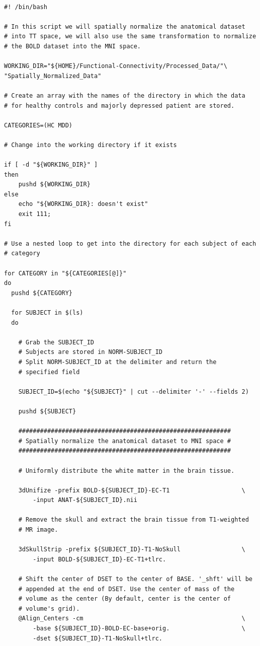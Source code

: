 \documentclass[12pt]{article}
\begin{document}
\begin{verbatim}

#! /bin/bash

# In this script we will spatially normalize the anatomical dataset
# into TT space, we will also use the same transformation to normalize
# the BOLD dataset into the MNI space.

WORKING_DIR="${HOME}/Functional-Connectivity/Processed_Data/"\
"Spatially_Normalized_Data"

# Create an array with the names of the directory in which the data
# for healthy controls and majorly depressed patient are stored.

CATEGORIES=(HC MDD)

# Change into the working directory if it exists

if [ -d "${WORKING_DIR}" ]
then
    pushd ${WORKING_DIR}
else
    echo "${WORKING_DIR}: doesn't exist"
    exit 111;
fi

# Use a nested loop to get into the directory for each subject of each
# category

for CATEGORY in "${CATEGORIES[@]}"
do
  pushd ${CATEGORY}

  for SUBJECT in $(ls)
  do

    # Grab the SUBJECT_ID
    # Subjects are stored in NORM-SUBJECT_ID
    # Split NORM-SUBJECT_ID at the delimiter and return the
    # specified field

    SUBJECT_ID=$(echo "${SUBJECT}" | cut --delimiter '-' --fields 2)

    pushd ${SUBJECT}

    ###########################################################
    # Spatially normalize the anatomical dataset to MNI space #
    ###########################################################

    # Uniformly distribute the white matter in the brain tissue.

    3dUnifize -prefix BOLD-${SUBJECT_ID}-EC-T1                    \
        -input ANAT-${SUBJECT_ID}.nii

    # Remove the skull and extract the brain tissue from T1-weighted
    # MR image.

    3dSkullStrip -prefix ${SUBJECT_ID}-T1-NoSkull                 \
        -input BOLD-${SUBJECT_ID}-EC-T1+tlrc.

    # Shift the center of DSET to the center of BASE. '_shft' will be
    # appended at the end of DSET. Use the center of mass of the
    # volume as the center (By default, center is the center of
    # volume's grid).
    @Align_Centers -cm                                            \
        -base ${SUBJECT_ID}-BOLD-EC-base+orig.                    \
        -dset ${SUBJECT_ID}-T1-NoSkull+tlrc.


\end{verbatim}
\end{document}
